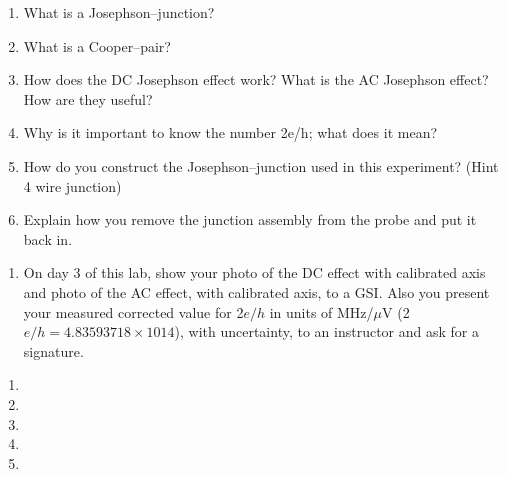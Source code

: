 \documentclass{../signatures}
\begin{document}
\maketitle

\names

\prelab

\begin{enumerate}

    \item What is a Josephson–junction?
    
    \item What is a Cooper–pair?

    \item How does the DC Josephson effect work? What is the AC Josephson effect? How are they useful?

    \item Why is it important to know the number 2e/h; what does it mean?

    \item How do you construct the Josephson–junction used in this experiment? (Hint 4 wire junction)

    \item Explain how you remove the junction assembly from the probe and put it back in.
       \\[36pt]
\end{enumerate}

\prelabsignatures

\midlab

\begin{enumerate}

    \item On day 3 of this lab, show your photo of the DC effect with calibrated axis and photo of the AC effect, with calibrated axis, to a GSI. Also you present your measured corrected value for 2$e/h$ in units of MHz/$\mu$V (2$e/h= 4.83593718 \times 1014$), with uncertainty, to an instructor and ask for a signature.
\\[36pt]
\end{enumerate}


\checkpointsection 

\begin{enumerate}

\item {}

\item {}

\item {}

\item {}

\item {}

\end{enumerate}
\end{document}

